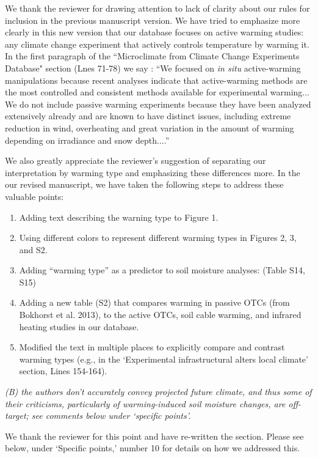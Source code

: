 \documentclass[11pt,a4paper]{letter}
\begin{document}
\begin{letter}{}
\par We thank the reviewer for drawing attention to lack of clarity about our rules for inclusion in the previous manuscript version. We have tried to emphasize more clearly in this new version that our database focuses on active warming studies: any climate change experiment that actively controls temperature by warming it. In the first paragraph of the ``Microclimate from Climate Change Experiments Database" section (Lnes 71-78) we say : ``We focused on \textit{in situ} active-warming manipulations because recent analyses indicate that active-warming methods are the most controlled and consistent methods available for experimental warming... We do not include passive warming experiments because they have been analyzed extensively already and are known to have distinct issues, including extreme reduction in wind, overheating and great variation in the amount of warming depending on irradiance and snow depth....''
\par We also greatly appreciate the reviewer's suggestion of separating our interpretation by warming type and emphasizing these differences more. In the our revised manuscript, we have taken the following steps to address these valuable points:
\begin{enumerate}
\item Adding text describing the warning type to Figure 1.
\item Using different colors  to represent different warming types in Figures 2, 3, and S2.
\item Adding ``warming type'' as a predictor to soil moisture analyses: (Table S14, S15)
\item Adding a new table (S2) that compares warming in passive OTCs (from Bokhorst et al. 2013), to the active OTCs, soil cable warming, and infrared heating studies in our database.
\item Modified the text in multiple places to explicitly compare and contrast warming types (e.g., in the `Experimental infrastructural alters local climate' section, Lines 154-164). 
\end{enumerate}


\par \emph{(B) the authors don't accurately convey projected future climate, and thus some of their criticisms, particularly of warming-induced soil moisture changes, are off-target; see comments below under `specific points'.}

\par We thank the reviewer for this point and have re-written the section. Please see below, under `Specific points,' number 10 for details on how we addressed this. 


\end{letter}
\end{document}
